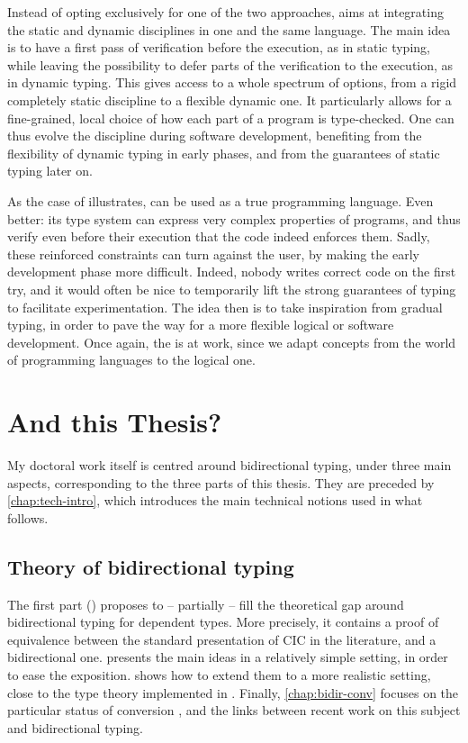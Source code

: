 Instead of opting exclusively for one of the two approaches,
  aims at integrating
the static and dynamic disciplines in one and the
same language.
The main idea is to have a first pass of verification before the execution, as in static typing,
while leaving the possibility to defer parts of the verification to the execution, as in
dynamic typing.
This gives access to a whole spectrum of options, from a rigid completely static
discipline to a flexible dynamic one. It particularly allows for a fine-grained, local choice
of how each part of a program is type-checked.
One can thus evolve the discipline during software development, benefiting from
the flexibility of dynamic typing in early phases, and from the guarantees of static typing
later on.

As the case of  illustrates,  can be used as a true programming language.
Even better: its type system can express very complex properties of programs, and thus
verify even before their execution that the code indeed enforces them.
Sadly, these reinforced constraints can turn against the user, by making the
early development phase more difficult. Indeed, nobody writes correct code on the first try,
and it would often be nice to temporarily lift the strong guarantees of typing to
facilitate experimentation. The idea then is to take inspiration from gradual typing,
in order to pave the way for a more flexible logical or software development. Once again, the
 is at work, since we adapt concepts from the world of
programming languages to the logical one.

\section{And this Thesis?}
\label{sec:this-thesis}

My doctoral work itself is centred around bidirectional typing, under three main aspects,
corresponding to the three parts of this thesis.
They are preceded by \cref{chap:tech-intro}, which introduces the main technical notions
used in what follows.

\subsection{Theory of bidirectional typing}

The first part () proposes to – partially – fill the theoretical gap around
bidirectional typing for dependent types. More precisely, it contains a proof of equivalence
between the standard presentation of CIC in the literature, and a bidirectional one.
 presents the main ideas in a relatively
simple setting, in order to ease the exposition.  shows how to extend
them to a more realistic setting, close to the type theory implemented in .
Finally, \cref{chap:bidir-conv} focuses on the particular status of conversion%
,
and the links between recent work on this subject and bidirectional typing.

